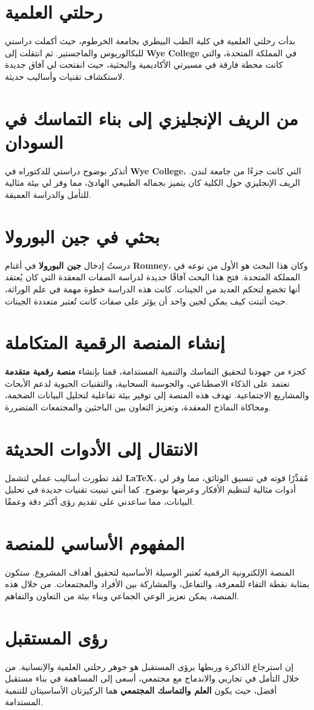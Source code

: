 \documentclass[12pt]{article}
\begin{document}
\section{رحلتي العلمية}
بدأت رحلتي العلمية في كلية الطب البيطري بجامعة الخرطوم، حيث أكملت دراستي للبكالوريوس والماجستير.  
ثم انتقلت إلى \textbf{Wye College} في المملكة المتحدة، والتي كانت محطة فارقة في مسيرتي الأكاديمية والبحثية، حيث انفتحت لي آفاق جديدة لاستكشاف تقنيات وأساليب حديثة.

\section{من الريف الإنجليزي إلى بناء التماسك في السودان}
أتذكر بوضوح دراستي للدكتوراه في \textbf{Wye College}، التي كانت جزءًا من جامعة لندن. الريف الإنجليزي حول الكلية كان يتميز بجماله الطبيعي الهادئ، مما وفر لي بيئة مثالية للتأمل والدراسة العميقة.

\section{بحثي في جين البورولا}
درستُ إدخال \textbf{جين البورولا} في أغنام \textbf{Romney}، وكان هذا البحث هو الأول من نوعه في المملكة المتحدة.  
فتح هذا البحث آفاقًا جديدة لدراسة الصفات المعقدة التي كان يُعتقد أنها تخضع لتحكم العديد من الجينات.  
كانت هذه الدراسة خطوة مهمة في علم الوراثة، حيث أثبتت كيف يمكن لجين واحد أن يؤثر على صفات كانت تُعتبر متعددة الجينات.

\section{إنشاء المنصة الرقمية المتكاملة}
كجزء من جهودنا لتحقيق التماسك والتنمية المستدامة، قمنا بإنشاء \textbf{منصة رقمية متقدمة} تعتمد على الذكاء الاصطناعي، والحوسبة السحابية، والتقنيات الحيوية لدعم الأبحاث والمشاريع الاجتماعية.  
تهدف هذه المنصة إلى توفير بيئة تفاعلية لتحليل البيانات الضخمة، ومحاكاة النماذج المعقدة، وتعزيز التعاون بين الباحثين والمجتمعات المتضررة.

\section{الانتقال إلى الأدوات الحديثة}
لقد تطورت أساليب عملي لتشمل \textbf{LaTeX}، مُقدِّرًا قوته في تنسيق الوثائق، مما وفر لي أدوات مثالية لتنظيم الأفكار وعرضها بوضوح.  
كما أنني تبنيت تقنيات جديدة في تحليل البيانات، مما ساعدني على تقديم رؤى أكثر دقة وعمقًا.

\section{\textcolor{sectionColor}{المفهوم الأساسي للمنصة}} المنصة الإلكترونية الرقمية تُعتبر الوسيلة الأساسية لتحقيق أهداف المشروع. ستكون بمثابة نقطة التقاء للمعرفة، والتفاعل، والمشاركة بين الأفراد والمجتمعات. من خلال هذه المنصة، يمكن تعزيز الوعي الجماعي وبناء بيئة من التعاون والتفاهم.
\section{\textcolor{sectionColor}{رؤى المستقبل}}
إن استرجاع الذاكرة وربطها برؤى المستقبل هو جوهر رحلتي العلمية والإنسانية.  
من خلال التأمل في تجاربي والاندماج مع مجتمعي، أسعى إلى المساهمة في بناء مستقبل أفضل، حيث يكون \textbf{العلم والتماسك المجتمعي} هما الركيزتان الأساسيتان للتنمية المستدامة.
\end{document}

